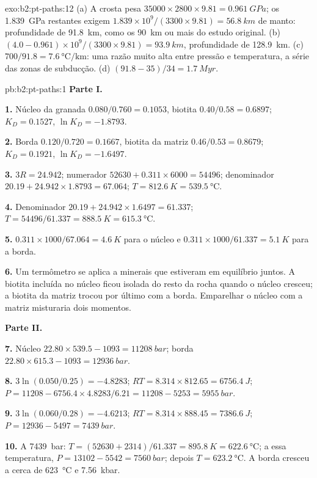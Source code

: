 \begin{solution}{exo:b2:pt-paths:12}
(a) A crosta pesa $35000\times2800\times9.81 = \qty{0.961}{GPa}$; os
\qty{1.839}{GPa} restantes exigem $1.839\times10^9/(3300\times9.81) = \qty{56.8}{km}$ de manto: profundidade de
\qty{91.8}{km}, como os \qty{90}{km} ou mais do estudo original. (b) $(4.0 -
0.961)\times10^9/(3300\times9.81) = \qty{93.9}{km}$, profundidade de \qty{128.9}{km}.
(c) $700/91.8 = \qty{7.6}{\celsius\per\km}$: uma razão muito alta entre pressão e
temperatura, a série das zonas de subducção. (d) $(91.8 - 35)/34 = \qty{1.7}{Myr}$.
\end{solution}

\begin{solution}{pb:b2:pt-paths:1}
\noindent\textbf{Parte I.}

\textbf{1.} Núcleo da granada $0.080/0.760 = 0.1053$, biotita $0.40/0.58 = 0.6897$; $K_D =
0.1527$, $\ln K_D = -1.8793$.

\textbf{2.} Borda $0.120/0.720 = 0.1667$, biotita da matriz $0.46/0.53 = 0.8679$; $K_D =
0.1921$, $\ln K_D = -1.6497$.

\textbf{3.} $3R = 24.942$; numerador $52630 + 0.311\times6000 = 54496$; denominador $20.19
+ 24.942\times1.8793 = 67.064$; $T = \qty{812.6}{K} = \qty{539.5}{\celsius}$.

\textbf{4.} Denominador $20.19 + 24.942\times1.6497 = 61.337$; $T = 54496/61.337 =
\qty{888.5}{K} = \qty{615.3}{\celsius}$.

\textbf{5.} $0.311\times1000/67.064 = \qty{4.6}{K}$ para o núcleo e $0.311\times1000/61.337
= \qty{5.1}{K}$ para a borda.

\textbf{6.} Um termômetro se aplica a minerais que estiveram em equilíbrio juntos. A
biotita incluída no núcleo ficou isolada do resto da rocha quando o núcleo cresceu;
a biotita da matriz trocou por último com a borda. Emparelhar o núcleo com a matriz misturaria
dois momentos.

\noindent\textbf{Parte II.}

\textbf{7.} Núcleo $22.80\times539.5 - 1093 = \qty{11208}{bar}$; borda $22.80\times615.3 -
1093 = \qty{12936}{bar}$.

\textbf{8.} $3\ln(0.050/0.25) = -4.8283$; $RT = 8.314\times812.65 = \qty{6756.4}{J}$; $P =
11208 - 6756.4\times4.8283/6.21 = 11208 - 5253 = \qty{5955}{bar}$.

\textbf{9.} $3\ln(0.060/0.28) = -4.6213$; $RT = 8.314\times888.45 = \qty{7386.6}{J}$; $P
= 12936 - 5497 = \qty{7439}{bar}$.

\textbf{10.} A \qty{7439}{bar}: $T = (52630 + 2314)/61.337 = \qty{895.8}{K} =
\qty{622.6}{\celsius}$; a essa temperatura, $P = 13102 - 5542 = \qty{7560}{bar}$; depois $T
= \qty{623.2}{\celsius}$. A borda cresceu a cerca de \qty{623}{\celsius} e \qty{7.56}{kbar}.


\end{solution}
